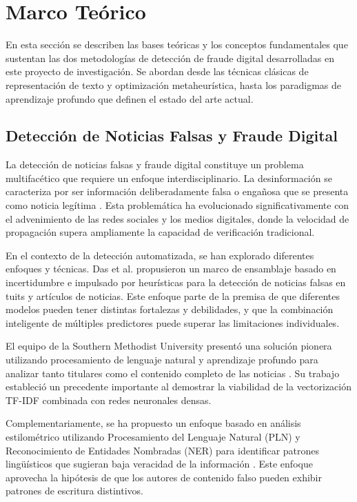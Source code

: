 \chapter{Marco Teórico \label{cap:MarcoTeorico}}

En esta sección se describen las bases teóricas y los conceptos fundamentales que sustentan las dos metodologías de detección de fraude digital desarrolladas en este proyecto de investigación. Se abordan desde las técnicas clásicas de representación de texto y optimización metaheurística, hasta los paradigmas de aprendizaje profundo que definen el estado del arte actual.

\section{Detección de Noticias Falsas y Fraude Digital}
\label{sec:deteccion_noticias_falsas}

La detección de noticias falsas y fraude digital constituye un problema multifacético que requiere un enfoque interdisciplinario. La desinformación se caracteriza por ser información deliberadamente falsa o engañosa que se presenta como noticia legítima \cite{bondielli2019survey}. Esta problemática ha evolucionado significativamente con el advenimiento de las redes sociales y los medios digitales, donde la velocidad de propagación supera ampliamente la capacidad de verificación tradicional.

En el contexto de la detección automatizada, se han explorado diferentes enfoques y técnicas. Das et al. \cite{das2022heuristic} propusieron un marco de ensamblaje basado en incertidumbre e impulsado por heurísticas para la detección de noticias falsas en tuits y artículos de noticias. Este enfoque parte de la premisa de que diferentes modelos pueden tener distintas fortalezas y debilidades, y que la combinación inteligente de múltiples predictores puede superar las limitaciones individuales.

El equipo de la Southern Methodist University presentó una solución pionera utilizando procesamiento de lenguaje natural y aprendizaje profundo para analizar tanto titulares como el contenido completo de las noticias \cite{thota2018fake}. Su trabajo estableció un precedente importante al demostrar la viabilidad de la vectorización TF-IDF combinada con redes neuronales densas.

Complementariamente, se ha propuesto un enfoque basado en análisis estilométrico utilizando Procesamiento del Lenguaje Natural (PLN) y Reconocimiento de Entidades Nombradas (NER) para identificar patrones lingüísticos que sugieran baja veracidad de la información \cite{tsai2023stylometric}. Este enfoque aprovecha la hipótesis de que los autores de contenido falso pueden exhibir patrones de escritura distintivos.

